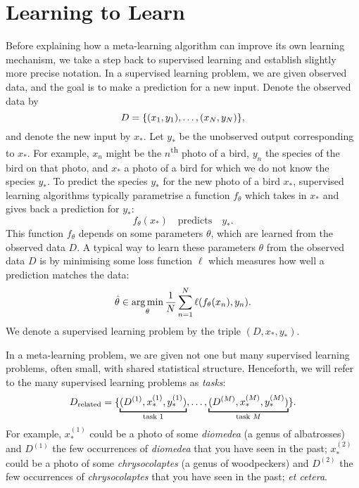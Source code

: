 \documentclass[12pt, twoside]{report}
\begin{document}
\section{Learning to Learn}
\label{sec:introducion:learning_to_learn}
Before explaining how a meta-learning algorithm can improve its own learning mechanism,
we take a step back to supervised learning and establish slightly more precise notation.
In a supervised learning problem, we are given observed data, and the goal is to make a prediction for a new input.
Denote the observed data by
\begin{equation} \label{eq:introduction:supervised_observed_data}
    D = \set{(x_1, y_1), \ldots, (x_N, y_N)},
\end{equation}
and denote the new input by $x_*$.
Let $y_*$ be the unobserved output corresponding to $x_*$.
For example, $x_n$ might be the $n$\textsuperscript{th} photo of a bird, $y_n$ the species of the bird on that photo, and $x_*$ a photo of a bird for which we do not know the species $y_*$.
To predict the species $y_*$ for the new photo of a bird $x_*$, supervised learning algorithms typically parametrise a function $f_\theta$ which takes in $x_*$ and gives back a prediction for $y_*$: 
\begin{equation}
    f_\theta(x_*)
    \quad\text{predicts}\quad
    y_*
    .
\end{equation}
This function $f_\theta$ depends on some parameters $\theta$, which are learned from the observed data $D$.
A typical way to learn these parameters $\theta$ from the observed data $D$ is by minimising some loss function $\ell$ which measures how well a prediction matches the data:
\begin{equation} \label{eq:supervised_learning_minimisation}
    \hat\theta \in \argmin_{\theta} \frac1N \sum_{n=1}^N \ell(f_\theta(x_n), y_n).
\end{equation}
We denote a supervised learning problem by the triple $(D, x_*, y_*)$.

In a meta-learning problem, we are given not one but many supervised learning problems, often small, with shared statistical structure.
Henceforth, we will refer to the many supervised learning problems as \emph{tasks}:
\begin{equation} \label{eq:introduction:related_data}
    D\ss{related} = \set{
        \underbracket[1pt]{(D^{(1)}, x_{*}^{(1)}, y_{*}^{(1)})}_{\text{task $1$}},
        \ldots,
        \underbracket[1pt]{(D^{(M)},x_*^{(M)}, y_{*}^{(M)})}_{\text{task $M$}}
    }.
\end{equation}
For example, $\displaystyle x^{(1)}_*$ could be a photo of some \emph{diomedea} (a genus of albatrosses) and $D^{(1)}$ the few occurrences of \emph{diomedea} that you have seen in the past;
$\displaystyle x^{(2)}_*$ could be a photo of some \emph{chrysocolaptes} (a genus of woodpeckers) and $D^{(2)}$ the few occurrences of \emph{chrysocolaptes} that you have seen in the past;
\textit{et cetera}.
\end{document}
